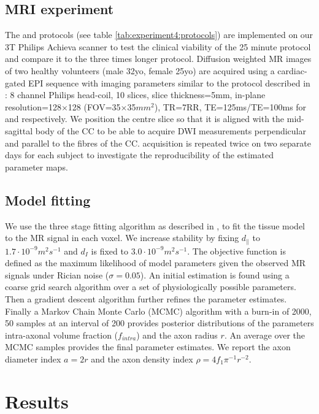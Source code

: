 \subsection{MRI experiment}
The \SFshort{} and \OIlong{} protocols (see table \ref{tab:experiment4:protocols}) are implemented on our 3T Philips Achieva scanner to test the clinical viability of the 25 minute \SFshort{} protocol and compare it to the three times longer \OIlong{} protocol. Diffusion weighted MR images of two healthy volunteers (male 32yo, female 25yo) are acquired using a cardiac-gated EPI sequence with imaging parameters similar to the protocol described in \citep{Alexander:2010}: 8 channel Philips head-coil, 10 slices, slice thickness=5mm, in-plane resolution=128$\times$128 (FOV=35$\times$35$mm^2$), TR=7RR, TE=125ms/TE=100ms for \SFshort{} and \OIlong{} respectively. We position the centre slice so that it is aligned with the mid-sagittal body of the \gls{CC} to be able to acquire DWI measurements perpendicular and parallel to the fibres of the \gls{CC}. \SFshort{} acquisition is repeated twice on two separate days for each subject to investigate the reproducibility of the estimated parameter maps.
%
\subsection{Model fitting}
We use the three stage fitting algorithm as described in \citet{Alexander:2010}, to fit the tissue model to the  MR signal in each voxel. We increase stability by fixing $d_\parallel$ to $1.7\cdot 10^{-9} m^2s^{-1}$ and $d_I$ is fixed to $3.0\cdot 10^{-9} m^2s^{-1}$\citep{Assaf:2008,Barazany:2009,Alexander:2010}. The objective function is defined as the maximum likelihood of model parameters given the observed MR signals under Rician noise ($\sigma=0.05$). An initial estimation is found using a coarse grid search algorithm over a set of physiologically possible parameters. Then a gradient descent algorithm further refines the parameter estimates. Finally a Markov Chain Monte Carlo (MCMC) algorithm with a burn-in of 2000, 50 samples at an interval of 200 provides posterior distributions of the parameters intra-axonal volume fraction ($f_{intra}$) and the axon radius $r$. An average over the MCMC samples provides the final parameter estimates. We report the axon diameter index $a=2r$ and the axon density index $\rho=4f_1\pi^{-1}r^{-2}$.
\section{Results}
